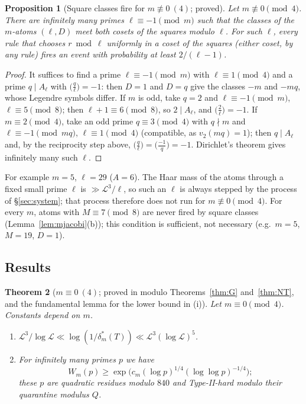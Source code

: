 \documentclass[11pt,reqno]{amsart}
\newtheorem{theorem}{Theorem}[section]
\newtheorem{proposition}[theorem]{Proposition}
\theoremstyle{definition}
\newcommand{\Lc}{\mathcal L}
\begin{document}
\begin{proposition}[Square classes fire for $m\not\equiv0\ (4)$; proved]\label{prop:mfire}
Let $m\not\equiv0\pmod4$.  There are infinitely many primes $\ell\equiv-1\pmod m$ such
that the classes of the $m$-atoms $(\ell,D)$ meet both cosets of the squares
modulo $\ell$.  For such $\ell$, every rule that chooses $r\bmod\ell$ uniformly in a
coset of the squares (either coset, by any rule) fires an event with
probability at least $2/(\ell-1)$.
\end{proposition}

\begin{proof}
It suffices to find a prime $\ell\equiv-1\pmod m$ with $\ell\equiv1\pmod4$ and a prime
$q\mid A_\ell$ with $\big(\frac q\ell\big)=-1$: then $D=1$ and $D=q$ give the classes
$-m$ and $-mq$, whose Legendre symbols differ.  If $m$ is odd, take $q=2$ and
$\ell\equiv-1\pmod m$, $\ell\equiv5\pmod8$; then $\ell+1\equiv6\pmod8$, so $2\mid A_\ell$, and
$\big(\frac2\ell\big)=-1$.  If $m\equiv2\pmod4$, take an odd prime $q\equiv3\pmod4$ with
$q\nmid m$ and $\ell\equiv-1\pmod{mq}$, $\ell\equiv1\pmod4$ (compatible, as $v_2(mq)=1$); then
$q\mid A_\ell$ and, by the reciprocity step above, $\big(\frac q\ell\big)=\big(\frac{-1}q\big)=-1$.
Dirichlet's theorem gives infinitely many such $\ell$.
\end{proof}

For example $m=5$, $\ell=29$ ($A=6$).  The Haar mass of the atoms through a fixed
small prime $\ell$ is $\gg\Lc^3/\ell$, so such an $\ell$ is always stepped by the
process of \S\ref{sec:system}; that process therefore does not run for
$m\not\equiv0\pmod4$.  For every $m$, atoms with $M\equiv7\pmod8$ are never fired by
square classes (Lemma~\ref{lem:mjacobi}(b)); this condition is sufficient, not
necessary (e.g.\ $m=5$, $M=19$, $D=1$).

\subsection*{Results}
\begin{theorem}[$m\equiv0\ (4)$; proved in {\cite{MN}} modulo Theorems~\ref{thm:G} and~\ref{thm:NT}, and the fundamental lemma for the lower bound in (i)]\label{thm:mzero}
Let $m\equiv0\pmod4$.  Constants depend on $m$.
\begin{enumerate}
\item[(i)] $\Lc^3/\log\Lc\ll\log(1/\delta_m^*(T))\ll\Lc^3(\log\Lc)^5$.
\item[(ii)] For infinitely many primes $p$ we have
\[
 W_m(p)\ge\exp\big(c_m(\log p)^{1/4}(\log\log p)^{-1/4}\big);
\]
these $p$ are quadratic residues modulo $840$ and Type-II-hard modulo their quarantine modulus $Q$.
\end{enumerate}
\end{theorem}
\end{document}
